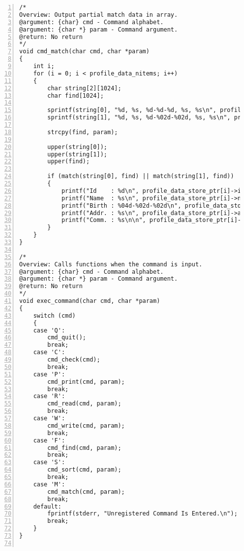 \documentclass[autodetect-engine,dvi=dvipdfmx,ja=standard,
               a4j,11pt]{bxjsarticle}
\begin{document}
\begin{Verbatim}[numbers=left, xleftmargin=10mm, numbersep=6pt,
    fontsize=\small, baselinestretch=0.8]
/*
Overview: Output partial match data in array.
@argument: {char} cmd - Command alphabet.
@argument: {char *} param - Command argument.
@return: No return
*/
void cmd_match(char cmd, char *param)
{
    int i;
    for (i = 0; i < profile_data_nitems; i++)
    {
        char string[2][1024];
        char find[1024];

        sprintf(string[0], "%d, %s, %d-%d-%d, %s, %s\n", profile_data_store_ptr[i]->id, profile_data_store_ptr[i]->name, profile_data_store_ptr[i]->birthday.y, profile_data_store_ptr[i]->birthday.m, profile_data_store_ptr[i]->birthday.d, profile_data_store_ptr[i]->address, profile_data_store_ptr[i]->note);
        sprintf(string[1], "%d, %s, %d-%02d-%02d, %s, %s\n", profile_data_store_ptr[i]->id, profile_data_store_ptr[i]->name, profile_data_store_ptr[i]->birthday.y, profile_data_store_ptr[i]->birthday.m, profile_data_store_ptr[i]->birthday.d, profile_data_store_ptr[i]->address, profile_data_store_ptr[i]->note);

        strcpy(find, param);

        upper(string[0]);
        upper(string[1]);
        upper(find);

        if (match(string[0], find) || match(string[1], find))
        {
            printf("Id    : %d\n", profile_data_store_ptr[i]->id);
            printf("Name  : %s\n", profile_data_store_ptr[i]->name);
            printf("Birth : %04d-%02d-%02d\n", profile_data_store_ptr[i]->birthday.y, profile_data_store_ptr[i]->birthday.m, profile_data_store_ptr[i]->birthday.d);
            printf("Addr. : %s\n", profile_data_store_ptr[i]->address);
            printf("Comm. : %s\n\n", profile_data_store_ptr[i]->note);
        }
    }
}

/*
Overview: Calls functions when the command is input.
@argument: {char} cmd - Command alphabet.
@argument: {char *} param - Command argument.
@return: No return
*/
void exec_command(char cmd, char *param)
{
    switch (cmd)
    {
    case 'Q':
        cmd_quit();
        break;
    case 'C':
        cmd_check(cmd);
        break;
    case 'P':
        cmd_print(cmd, param);
        break;
    case 'R':
        cmd_read(cmd, param);
        break;
    case 'W':
        cmd_write(cmd, param);
        break;
    case 'F':
        cmd_find(cmd, param);
        break;
    case 'S':
        cmd_sort(cmd, param);
        break;
    case 'M':
        cmd_match(cmd, param);
        break;
    default:
        fprintf(stderr, "Unregistered Command Is Entered.\n");
        break;
    }
}


\end{Verbatim}
\end{document}

